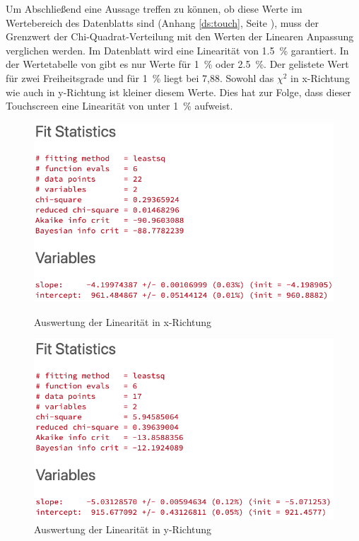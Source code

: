 Um Abschließend eine Aussage treffen zu können, ob diese Werte im Wertebereich des Datenblatts sind (Anhang \ref{ds:touch}, Seite \pageref{ds:touch}), muss der Grenzwert der Chi-Quadrat-Verteilung mit den Werten der Linearen Anpassung verglichen werden.
Im Datenblatt wird eine Linearität von \SI{1,5}{\%} garantiert. In der Wertetabelle von \cite{papula} gibt es nur Werte für \SI{1}{\%} oder \SI{2,5}{\%}. Der gelistete Wert für zwei Freiheitsgrade und für \SI{1}{\%} liegt bei 7,88.
Sowohl das \(\chi^2\) in x-Richtung wie auch in y-Richtung ist kleiner diesem Werte. Dies hat zur Folge, dass dieser Touchscreen eine Linearität von unter \SI{1}{\%} aufweist.
\begin{figure}
    \begin{minipage}{0.49\linewidth}
        \centering
        \includegraphics[width=\linewidth]{fig/xfit.png}
        \caption{Auswertung der Linearität in x-Richtung}
        \label{fig:xfit}
    \end{minipage}
    \begin{minipage}{0.49\linewidth}
        \centering
        \includegraphics[width=\linewidth]{fig/yfit.png}
        \caption{Auswertung der Linearität in y-Richtung}
        \label{fig:yfit}
    \end{minipage}
\end{figure} 
